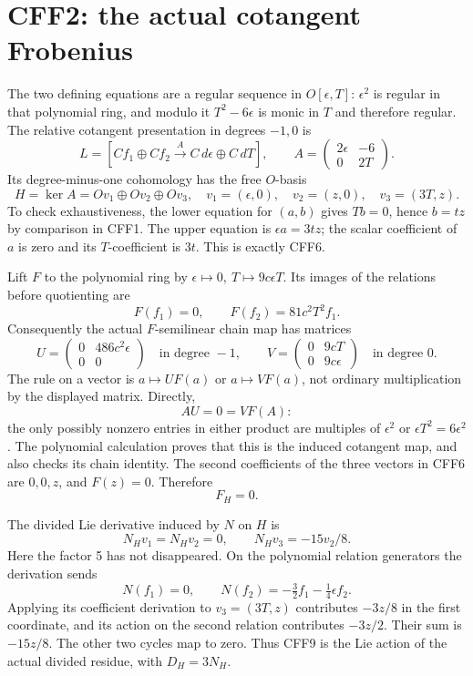 \documentclass[11pt]{article}
\begin{document}
\section{CFF2: the actual cotangent Frobenius}
The two defining equations are a regular sequence in \(O[\epsilon,T]\):
\(\epsilon^2\) is regular in that polynomial ring, and modulo it
\(T^2-6\epsilon\) is monic in \(T\) and therefore regular. The
relative cotangent presentation in degrees \(-1,0\) is
\[
 L=[C f_1\oplus C f_2 \xrightarrow{A}
                 C\,d\epsilon\oplus C\,dT],\qquad
 A=\begin{pmatrix}2\epsilon&-6\\0&2T\end{pmatrix}.
 \tag{CFF5}
\]
Its degree-minus-one cohomology has the free \(O\)-basis
\[
 H=\ker A=Ov_1\oplus Ov_2\oplus Ov_3,\quad
 v_1=(\epsilon,0),\quad v_2=(z,0),\quad v_3=(3T,z).
 \tag{CFF6}
\]
To check exhaustiveness, the lower equation for \((a,b)\) gives
\(Tb=0\), hence \(b=t z\) by comparison in CFF1. The upper equation
is \(\epsilon a=3t z\); the scalar coefficient of \(a\) is zero
and its \(T\)-coefficient is \(3t\). This is exactly CFF6.

Lift \(F\) to the polynomial ring by
\(\epsilon\mapsto0,\ T\mapsto9c\epsilon T\). Its images of the
relations before quotienting are
\[
 F(f_1)=0,\qquad F(f_2)=81c^2T^2f_1.
\]
Consequently the actual \(F\)-semilinear chain map has matrices
\[
 U=\begin{pmatrix}0&486c^2\epsilon\\0&0\end{pmatrix}
 \quad\text{in degree }-1,\qquad
 V=\begin{pmatrix}0&9cT\\0&9c\epsilon\end{pmatrix}
 \quad\text{in degree }0.
 \tag{CFF7}
\]
The rule on a vector is \(a\mapsto U F(a)\) or \(a\mapsto V F(a)\),
not ordinary multiplication by the displayed matrix. Directly,
\[
 AU=0=VF(A):
\]
the only possibly nonzero entries in either product are multiples
of \(\epsilon^2\) or \(\epsilon T^2=6\epsilon^2\).
The polynomial calculation proves that this is the induced
cotangent map, and also checks its chain identity.
The second coefficients of the three vectors in CFF6 are \(0,0,z\),
and \(F(z)=0\). Therefore
\[
                         F_H=0.
 \tag{CFF8}
\]

The divided Lie derivative induced by \(N\) on \(H\) is
\[
 N_Hv_1=N_Hv_2=0,\qquad N_Hv_3=-15v_2/8.
 \tag{CFF9}
\]
Here the factor 5 has not disappeared. On the polynomial relation
generators the derivation sends
\[
 N(f_1)=0,\qquad N(f_2)=-\tfrac32 f_1-\tfrac14\epsilon f_2.
\]
Applying its coefficient derivation to \(v_3=(3T,z)\) contributes
\(-3z/8\) in the first coordinate, and its action on the second
relation contributes \(-3z/2\). Their sum is \(-15z/8\).
The other two cycles map to zero. Thus CFF9 is the Lie action
of the actual divided residue, with \(D_H=3N_H\).
\end{document}
